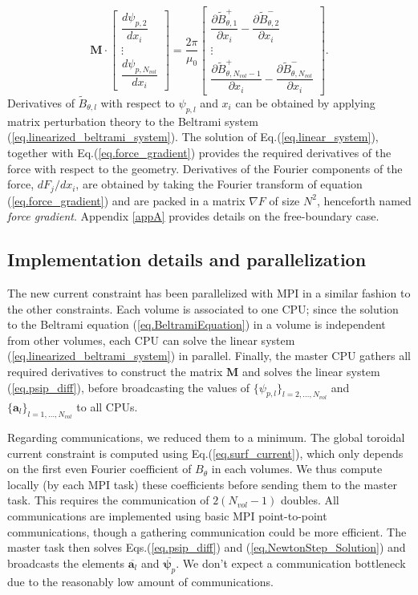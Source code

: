 \documentclass[my_thesis.tex]{subfiles}
\begin{document}
\begin{equation}
	\mathbf{M} \cdot  \begin{bmatrix}
		\dfrac{d\psi_{p,2}}{dx_i}\\
		\vdots\\
		\dfrac{d\psi_{p,N_{vol}}}{dx_i}
	\end{bmatrix} = \frac{2\pi}{\mu_0}\begin{bmatrix}
		\dfrac{\partial \tilde{B}^+_{\theta,1}}{\partial x_i} - \dfrac{\partial \tilde{B}^-_{\theta,2}}{\partial x_i} \\
		\vdots \\
		\dfrac{\partial \tilde{B}^+_{\theta,N_{vol}-1} } {\partial x_i} - \dfrac{\partial \tilde{B}^-_{\theta,N_{vol}}}{\partial x_i}
	\end{bmatrix}.\label{eq.linear_system}
\end{equation}
Derivatives of $\tilde{B}_{\theta,l}$ with respect to $\psi_{p,l}$ and $x_i$ can be obtained by applying matrix perturbation theory to the Beltrami system (\ref{eq.linearized_beltrami_system}). The solution of Eq.(\ref{eq.linear_system}), together with Eq.(\ref{eq.force_gradient}) provides the required derivatives of the force with respect to the geometry. Derivatives of the Fourier components of the force, $dF_j/dx_i$, are obtained by taking the Fourier transform of equation (\ref{eq.force_gradient}) and are packed in a matrix $\nabla F$ of size $N^2$, henceforth named \textit{force gradient}. Appendix \ref{appA} provides details on the free-boundary case. 

\subsection{Implementation details and parallelization}
The new current constraint has been parallelized with \ac{MPI} in a similar fashion to the other constraints. Each volume is associated to one \ac{CPU}; since the solution to the Beltrami equation (\ref{eq.BeltramiEquation}) in a volume is independent from other volumes, each \ac{CPU} can solve the linear system (\ref{eq.linearized_beltrami_system}) in parallel. Finally, the master \ac{CPU} gathers all required derivatives to construct the matrix $\mathbf{M}$ and solves the linear system (\ref{eq.psip_diff}), before broadcasting the values of $\{\psi_{p,l}\}_{l=2,\ldots,N_{vol}}$ and $\{\mathbf{a}_l\}_{l=1,\ldots,N_{vol}}$ to all \acp{CPU}.

Regarding communications, we reduced them to a minimum. The global toroidal current constraint is computed using Eq.(\ref{eq.surf_current}), which only depends on the first even Fourier coefficient of $B_\theta$ in each volumes. We thus compute locally (by each \ac{MPI} task) these coefficients before sending them to the master task. This requires the communication of $2(N_{vol}-1)$ doubles. All communications are implemented using basic \ac{MPI} point-to-point communications, though a gathering communication could be more efficient. The master task then solves Eqs.(\ref{eq.psip_diff}) and (\ref{eq.NewtonStep_Solution}) and broadcasts the elements $\overbar{\bm{a}_l}$ and $\overbar{\bm{\psi}_p}$. We don't expect a communication bottleneck due to the reasonably low amount of communications. 
\end{document}
